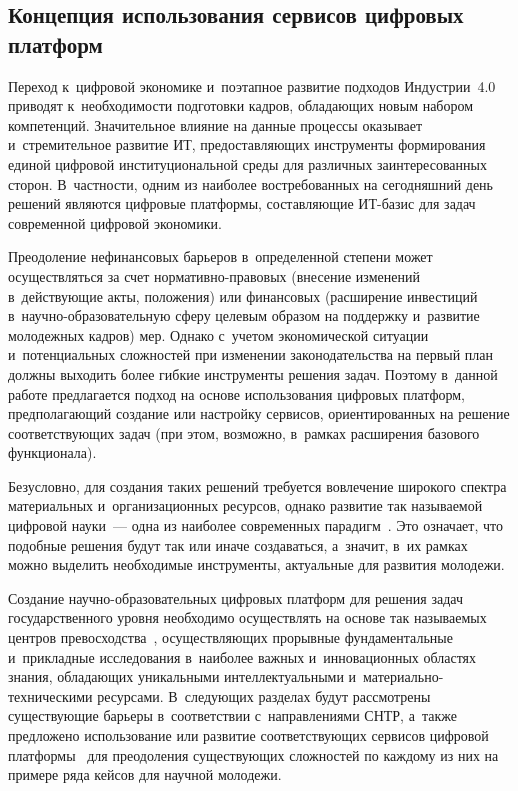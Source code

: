 \begin{multicols}{2}
\section{Концепция использования сервисов цифровых платформ}

\vspace*{-12pt}

Переход к~цифровой экономике и~поэтапное развитие подходов 
Индустрии~4.0~\cite{Schwab2016} приводят к~необходимости подготовки кадров, 
обладающих новым набором компетенций. Значительное влияние на данные процессы 
оказывает и~стремительное развитие ИТ, 
предоставляющих инструменты формирования единой цифровой институциональной 
среды для различных заинтересованных сторон. В~частности, одним из наиболее 
востребованных на сегодняшний день решений являются цифровые платформы, 
со\-став\-ля\-ющие ИТ-ба\-зис для задач современной цифровой экономики.

Преодоление нефинансовых барьеров в~определенной степени может осуществляться 
за счет нор\-ма\-тив\-но-пра\-во\-вых (внесение изменений в~действующие акты, положения) 
или финансовых (расширение инвестиций в~на\-уч\-но-об\-ра\-зо\-ва\-тель\-ную 
сферу целевым образом на поддержку и~развитие молодежных кадров) мер. Однако с~учетом 
экономической ситуации и~потенциальных сложностей при изменении законодательства на 
первый план должны выходить более гибкие инструменты решения задач. Поэтому в~данной 
работе предлагается подход на основе использования цифровых платформ, предполагающий 
создание или настройку сервисов, ориентированных на решение соответствующих задач 
(при этом, возможно, в~рамках расширения базового функционала). 

Безусловно, для 
создания таких решений требуется вовлечение широкого спектра 
материальных и~организационных ресурсов, однако развитие так называемой 
циф\-ро\-вой науки~--- одна из наиболее современных парадигм~\cite{Gorshenin2018a}. 
Это означает, что подобные решения будут так или иначе создаваться, а~значит, в~их 
рамках можно выделить необходимые инструменты, актуальные для развития молодежи.

Создание научно-об\-ра\-зо\-ва\-тель\-ных цифровых платформ для решения 
задач государственного уровня необходимо осуществлять на основе так называемых 
центров превосходства~\cite{Zaichenko2008}, осуществляющих прорывные фундаментальные 
и~прикладные исследования в~наиболее важных и~инновационных областях знания, 
обладающих уникальными интеллектуальными и~ма\-те\-ри\-аль\-но-тех\-ни\-че\-ски\-ми ресурсами. 
%
В~следующих разделах будут рассмотрены существующие барьеры в~соответствии 
с~направлениями СНТР, а~также предложено использование или развитие соответствующих 
сервисов цифровой платформы~\cite{Gorshenin2017} для преодоления существующих 
сложностей по каждому из них на примере ряда кейсов для научной молодежи.


\end{multicols}
